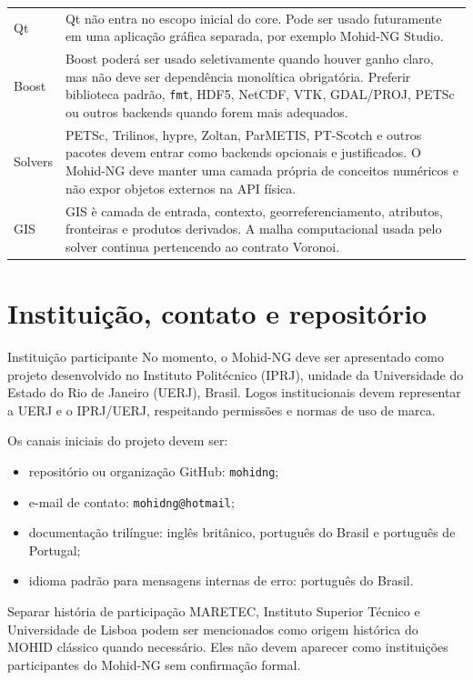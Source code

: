 \documentclass[11pt,a4paper]{article}
\begin{document}
\begin{longtable}{p{}p{}}
\addlinespace
Qt & Qt n\~ao entra no escopo inicial do core. Pode ser usado futuramente em uma aplica\c{c}\~ao gr\'afica separada, por exemplo Mohid-NG Studio.\tabularnewline
\addlinespace
Boost & Boost poder\'a ser usado seletivamente quando houver ganho claro, mas n\~ao deve ser depend\^encia monol\'itica obrigat\'oria. Preferir biblioteca padr\~ao, \texttt{fmt}, HDF5, NetCDF, VTK, GDAL/PROJ, PETSc ou outros backends quando forem mais adequados.\tabularnewline
\addlinespace
Solvers & PETSc, Trilinos, hypre, Zoltan, ParMETIS, PT-Scotch e outros pacotes devem entrar como backends opcionais e justificados. O Mohid-NG deve manter uma camada pr\'opria de conceitos num\'ericos e n\~ao expor objetos externos na API f\'isica.\tabularnewline
\addlinespace
GIS & GIS \`e camada de entrada, contexto, georreferenciamento, atributos, fronteiras e produtos derivados. A malha computacional usada pelo solver continua pertencendo ao contrato Voronoi.\tabularnewline
\bottomrule
\end{longtable}

\section{Institui\c{c}\~ao, contato e reposit\'orio}

\begin{principlebox}{Institui\c{c}\~ao participante}
No momento, o Mohid-NG deve ser apresentado como projeto desenvolvido no Instituto Polit\'ecnico (IPRJ), unidade da Universidade do Estado do Rio de Janeiro (UERJ), Brasil. Logos institucionais devem representar a UERJ e o IPRJ/UERJ, respeitando permiss\~oes e normas de uso de marca.
\end{principlebox}

Os canais iniciais do projeto devem ser:
\begin{itemize}
  \item reposit\'orio ou organiza\c{c}\~ao GitHub: \texttt{mohidng};
  \item e-mail de contato: \texttt{mohidng@hotmail};
  \item documenta\c{c}\~ao tril\'ingue: ingl\^es brit\^anico, portugu\^es do Brasil e portugu\^es de Portugal;
  \item idioma padr\~ao para mensagens internas de erro: portugu\^es do Brasil.
\end{itemize}

\begin{warningbox}{Separar hist\'oria de participa\c{c}\~ao}
MARETEC, Instituto Superior T\'ecnico e Universidade de Lisboa podem ser mencionados como origem hist\'orica do MOHID cl\'assico quando necess\'ario. Eles n\~ao devem aparecer como institui\c{c}\~oes participantes do Mohid-NG sem confirma\c{c}\~ao formal.
\end{warningbox}
\end{document}
